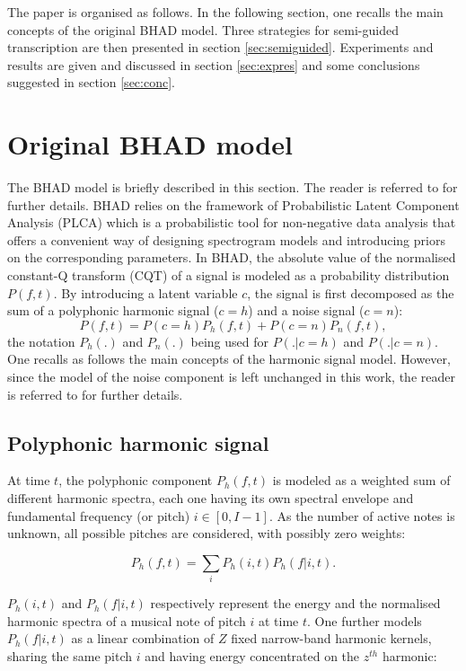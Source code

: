 \documentclass{article}
\begin{document}
The paper is organised as follows. In the following section, one recalls the main concepts of the original BHAD model. Three strategies for semi-guided transcription are then presented in section \ref{sec:semiguided}. Experiments and results are given and discussed in section \ref{sec:expres} and some conclusions suggested in section \ref{sec:conc}.

\section{Original BHAD model}
\label{sec:Bhad}
The BHAD model is briefly described in this section. The reader is referred to \cite{Fuentes2012_EUSIPCO} for further details. BHAD relies on the framework of Probabilistic Latent Component Analysis (PLCA) which is a probabilistic tool for non-negative data analysis that offers a convenient way of designing spectrogram models and introducing priors on the corresponding parameters.
In BHAD, the absolute value of the normalised constant-Q transform (CQT) of a signal is modeled as a probability distribution $P(f,t)$. By introducing a latent variable $c$, the signal is first decomposed as the sum of a polyphonic harmonic signal ($c=h$) and a noise signal ($c=n$):
\begin{equation}
P(f,t) = P(c=h)P_h(f,t)+P(c=n)P_n(f,t),
\end{equation}
the notation $P_h(.)$ and $P_n(.)$ being used for $P(.|c=h)$ and $P(.|c=n)$.  One recalls as follows the main concepts of the harmonic signal model. However, since the model of the noise component is left unchanged in this work, the reader is referred to \cite{Fuentes2012_EUSIPCO} for further details.

\subsection{Polyphonic harmonic signal}
At time $t$, the polyphonic component $P_h(f,t)$ is modeled as a weighted sum of different harmonic spectra, each one having its own spectral envelope and fundamental frequency (or pitch) $i \in \left[ 0, I-1 \right]$. As the number of active notes is unknown, all possible pitches are considered, with possibly zero weights:

\begin{equation}
P_h(f,t) = \sum_i P_h(i,t)P_h(f|i,t).
\end{equation}

$P_h(i,t)$ and $P_h(f|i,t)$ respectively represent the energy and the normalised harmonic spectra of a musical note of pitch $i$ at time $t$. One further models $P_h(f|i,t)$ as a linear combination of $Z$ fixed narrow-band harmonic kernels, sharing the same pitch $i$ and having energy concentrated on the $z^{th}$ harmonic:
\end{document}
